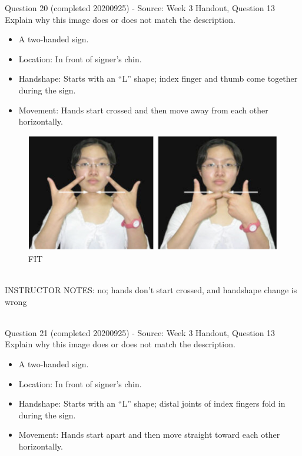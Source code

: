 \documentclass[12pt]{article}
\begin{document}
{\large Question 20} (completed 20200925) - Source: Week 3 Handout, Question 13\\

Explain why this image does or does not match the description.\\

\begin{itemize} \item A two-handed sign. \item Location: In front of signer’s chin. \item Handshape: Starts with an “L” shape; index finger and thumb come together during the sign. \item Movement: Hands start crossed and then move away from each other horizontally. \end{itemize}

\begin{figure}[H]
\includegraphics{../images/taiwansign_fit.png}
\caption{FIT}
\end{figure}

~\\
INSTRUCTOR NOTES: no; hands don't start crossed, and handshape change is wrong


~\\

{\large Question 21} (completed 20200925) - Source: Week 3 Handout, Question 13\\

Explain why this image does or does not match the description.\\

\begin{itemize} \item A two-handed sign. \item Location: In front of signer’s chin. \item Handshape: Starts with an “L” shape; distal joints of index fingers fold in during the sign. \item Movement: Hands start apart and then move straight toward each other horizontally. \end{itemize}
\end{document}
